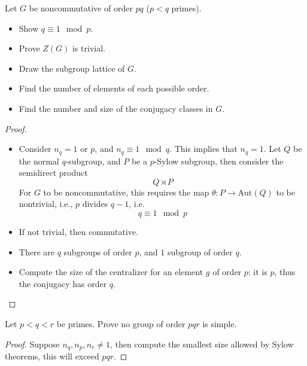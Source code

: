 \documentclass[openany]{book}
\begin{document}


\begin{prob}[2.19]
Let \( G \) be noncommutative of order \( pq \) (\( p < q \) primes).
\begin{itemize}
    \item Show \( q \equiv 1 \mod p \).
    \item Prove \( Z(G) \) is trivial.
    \item Draw the subgroup lattice of \( G \).
    \item Find the number of elements of each possible order.
    \item Find the number and size of the conjugacy classes in $G$.
\end{itemize}
\end{prob}
\begin{proof}
    \begin{itemize}
        \item Consider $n_q=1$ or $p$, and $n_q\equiv 1\mod q$. This implies that $n_q=1$. Let $Q$ be the normal $q$-subgroup, and $P$ be a $p$-Sylow subgroup, then consider the semidirect product 
        \begin{equation*}
            Q\rtimes P
        \end{equation*}
        For $G$ to be noncommutative, this requires the map $\theta: P\to\text{Aut}(Q)$ to be nontrivial, i.e., $p$ divides $q-1$, i.e.
        \begin{equation*}
            q\equiv 1\mod p
        \end{equation*}
        \item If not trivial, then commutative.
        \item There are $q$ subgroups of order $p$, and $1$ subgroup of order $q$.
        \item Compute the size of the centralizer for an element $g$ of order $p$: it is $p$, thus the conjugacy has order $q$.
    \end{itemize}
\end{proof}


\begin{prob}[2.21]
Let \( p < q < r \) be primes. Prove no group of order \( pqr \) is simple.
\end{prob}
\begin{proof}
    Suppose $n_q, n_p, n_r\neq 1$, then compute the smallest size allowed by Sylow theorems, this will exceed $pqr$.
\end{proof}
\end{document}
